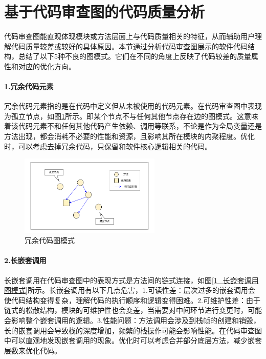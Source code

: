 \section{基于代码审查图的代码质量分析}
\label{4_不良图模式}


代码审查图能直观体现模块或方法层面上与代码质量相关的特征，从而辅助用户理解代码质量较差或较好的具体原因。本节通过分析代码审查图展示的软件代码结构，总结了以下5种不良的图模式。它们在不同的角度上反映了代码较差的质量属性和对应的优化方向。

\paragraph{1.冗余代码元素} 冗余代码元素指的是在代码中定义但从未被使用的代码元素。在代码审查图中表现为孤立节点，如图\ref{1_冗余代码图模式}所示。即某个节点不与任何其他节点存在边的图模式。这意味着该代码元素不和任何其他代码产生依赖、调用等联系，不论是作为全局变量还是方法出现，都会消耗不必要的性能和资源，且影响其所在模块的内聚程度。优化时，可以考虑去掉冗余代码，只保留和软件核心逻辑相关的代码。

\begin{figure}[h]
\centering
\includegraphics[width = 0.6\textwidth]{figures/孤立节点图模式_2.pdf}
\caption{冗余代码图模式}
\label{1_冗余代码图模式}
\end{figure}



\paragraph{2.长嵌套调用} 长嵌套调用在代码审查图中的表现方式是方法间的链式连接，如图\ref{1_长嵌套调用图模式}所示。长嵌套调用有以下几点危害，1.可读性差：层次过多的嵌套调用会使代码结构变得复杂，理解代码的执行顺序和逻辑变得困难。2.可维护性差：由于链式的松散结构，模块的可维护性也会变差，当需要对中间环节进行变更时，可能会影响整个嵌套调用的逻辑。3.性能问题：方法调用会涉及到栈帧的创建和销毁，长的嵌套调用会导致栈的深度增加，频繁的栈操作可能会影响性能。在代码审查图中可以直观地发现嵌套调用的现象。优化时可以考虑合并部分底层方法，减少嵌套层数来优化代码。

